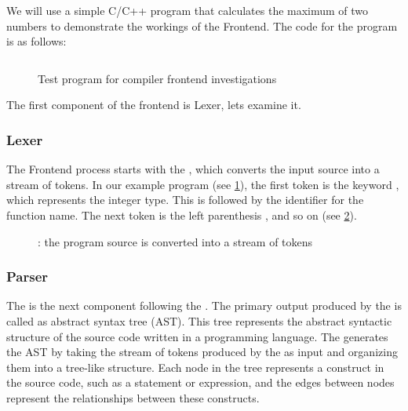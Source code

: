 We will use a simple C/C++ program that calculates the maximum of two numbers to
demonstrate the workings of the Frontend. The code for the program is as
follows: 
\begin{figure}[H]
\inputminted{c++}{./src/part1/ch2_arch/max.cpp}
\caption{Test program for compiler frontend investigations}
\label{fig:arch_max}
\end{figure}
The first component of the frontend is Lexer, lets examine it. 

\subsubsection{Lexer}

The Frontend process starts with the \lexer, which converts the input source
into a stream of tokens. In our example program (see \cref{fig:arch_max}), the
first token is the keyword , which represents the integer
type. This is followed by the identifier  for the function
name. The next token is the left parenthesis \myshell{(}, and so on (see
\cref{fig:lexer}). 
\begin{figure}
  \begin{center}
  \end{center}
  \caption{\lexer: the program source is converted into a stream of tokens} 
  \label{fig:lexer}
\end{figure}

\subsubsection{Parser}
The \parser is the next component following the \lexer. The primary output
produced by the \parser is called as abstract syntax tree (AST). This tree
represents the abstract syntactic structure of the source code written in a
programming language. The \parser generates the AST by taking the stream of
tokens produced by the \lexer as input and organizing them into a tree-like
structure. Each node in the tree represents a construct in the source code, such
as a statement or expression, and the edges between nodes represent the
relationships between these constructs. 

